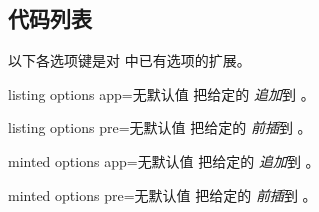 \subsection{代码列表}
以下各选项键是对
 中已有选项的扩展。


\begin{docTcbKey}[][doc new=2019-07-11]{listing options app}{=}{无默认值}
  把给定的  \emph{追加}到 。
\end{docTcbKey}

\begin{docTcbKey}[][doc new=2019-07-11]{listing options pre}{=}{无默认值}
  把给定的  \emph{前插}到 。
\end{docTcbKey}

\begin{docTcbKey}[][doc new=2019-07-11]{minted options app}{=}{无默认值}
  把给定的  \emph{追加}到 。
\end{docTcbKey}

\begin{docTcbKey}[][doc new=2019-07-11]{minted options pre}{=}{无默认值}
  把给定的  \emph{前插}到 。
\end{docTcbKey}


